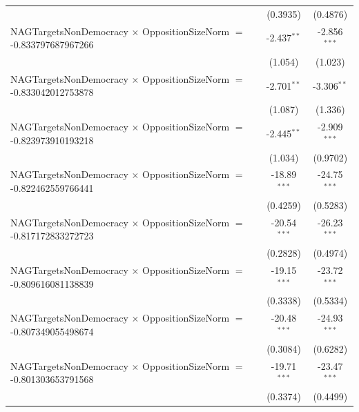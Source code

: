 \begin{tabular}{lcc}
                                                                                & (0.3935)             & (0.4876)\\   
   NAGTargetsNonDemocracy $\times$ OppositionSizeNorm $=$ -0.833797687967266    & -2.437$^{**}$        & -2.856$^{***}$\\   
                                                                                & (1.054)              & (1.023)\\   
   NAGTargetsNonDemocracy $\times$ OppositionSizeNorm $=$ -0.833042012753878    & -2.701$^{**}$        & -3.306$^{**}$\\   
                                                                                & (1.087)              & (1.336)\\   
   NAGTargetsNonDemocracy $\times$ OppositionSizeNorm $=$ -0.823973910193218    & -2.445$^{**}$        & -2.909$^{***}$\\   
                                                                                & (1.034)              & (0.9702)\\   
   NAGTargetsNonDemocracy $\times$ OppositionSizeNorm $=$ -0.822462559766441    & -18.89$^{***}$       & -24.75$^{***}$\\   
                                                                                & (0.4259)             & (0.5283)\\   
   NAGTargetsNonDemocracy $\times$ OppositionSizeNorm $=$ -0.817172833272723    & -20.54$^{***}$       & -26.23$^{***}$\\   
                                                                                & (0.2828)             & (0.4974)\\   
   NAGTargetsNonDemocracy $\times$ OppositionSizeNorm $=$ -0.809616081138839    & -19.15$^{***}$       & -23.72$^{***}$\\   
                                                                                & (0.3338)             & (0.5334)\\   
   NAGTargetsNonDemocracy $\times$ OppositionSizeNorm $=$ -0.807349055498674    & -20.48$^{***}$       & -24.93$^{***}$\\   
                                                                                & (0.3084)             & (0.6282)\\   
   NAGTargetsNonDemocracy $\times$ OppositionSizeNorm $=$ -0.801303653791568    & -19.71$^{***}$       & -23.47$^{***}$\\   
                                                                                & (0.3374)             & (0.4499)\\   

\end{tabular}
